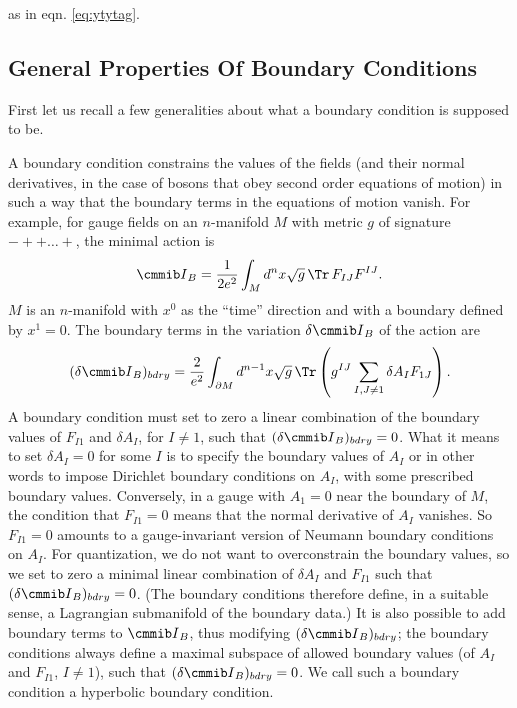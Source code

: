 as in eqn. \eqref{eq:ytytag}.

\subsection{General Properties Of Boundary Conditions}

First let us recall a few generalities about what a boundary
condition is supposed to be.

A boundary condition constrains the values of the fields (and
their normal derivatives, in the case of bosons that obey second
order equations of motion) in such a way that the boundary terms
in the equations of motion vanish.  For example, for gauge fields
on an $n$-manifold $M$ with metric $g$ of signature $-++\dots +$,
the minimal action is %
\setcounter{equation}{1}
\begin{equation}\label{eq:upco}
{{\cmmib I}}_B={1\over 2e^2}\int_M
d^nx \sqrt g\,\Tr \,F_{IJ}F^{IJ}.
\end{equation}
 $M$ is an $n$-manifold with
$x^0$ as the ``time'' direction and with a boundary defined by
$x^1=0$. The boundary terms in the variation $\delta {{\cmmib
I}}_B$ of the action are %
\setcounter{equation}{2}
\begin{equation}\label{eq:ofof}
(\delta {\cmmib
I}_B)_{bdry}={2\over e^2}\int_{\partial M}d^{n-1}x \sqrt
g\,\Tr\left(g^{IJ}\sum_{I,J\not=1}\delta A_I F_{1J}\right).
\end{equation}
  A
boundary condition must set to zero a linear combination of the
boundary values of $F_{I1}$ and $\delta A_I$, for $I\not= 1$, such
that $(\delta {{\cmmib I}}_B)_{bdry}=0$.  What it means to set
$\delta A_I=0$ for some $I$ is to specify the boundary values of
$A_I$ or in other words to impose Dirichlet boundary conditions on
$A_I$, with some prescribed boundary values. Conversely, in a
gauge with $A_1=0$ near the boundary of $M$, the condition that
$F_{I1}=0$ means that the normal derivative of $A_I$ vanishes.  So
$F_{I1}=0$ amounts to a gauge-invariant version of Neumann
boundary conditions on $A_I$. For quantization, we do not want to
overconstrain the boundary values, so we set to zero a minimal
linear combination of $\delta A_I$ and $F_{I1}$ such that $(\delta
{{\cmmib I}}_B)_{bdry}=0$.  (The boundary conditions therefore
define, in a suitable sense, a Lagrangian submanifold of the
boundary data.) It is also possible to add boundary terms to
${{\cmmib I}}_B$, thus modifying $(\delta {{\cmmib I}}_B)_{bdry}$;
the boundary conditions always define a maximal subspace of
allowed boundary values (of $A_I$ and $F_{I1}$, $I\not= 1$), such
that $(\delta {{\cmmib I}}_B)_{bdry}=0$. We call such a boundary
condition a hyperbolic boundary condition.

